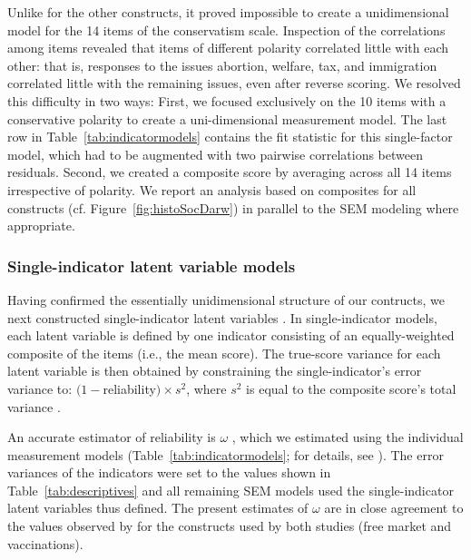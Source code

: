 \documentclass[fignum,man]{apa}\usepackage[]{graphicx}\usepackage[]{color}
\begin{document}
Unlike for the other constructs, it proved impossible to create a unidimensional 
model for the 14 items of the conservatism scale. Inspection of the correlations among
items revealed that items of different polarity correlated little with each
other: that is, responses to the issues abortion, welfare, tax, and immigration
correlated little with the remaining issues, even after reverse scoring. 
We resolved this difficulty in two ways: First, we focused
exclusively on the 10 items
with a conservative polarity to create 
a uni-dimensional measurement model.
The last row in Table~\ref{tab:indicatormodels} contains the
fit statistic for this single-factor model, which 
had to be augmented with two pairwise correlations between residuals.
Second, 
  we created a composite score by averaging across all 
  14 items irrespective of polarity. 
  We report an analysis based on composites for all constructs (cf. Figure~\ref{fig:histoSocDarw}) 
  in parallel to the SEM modeling where appropriate.

\subsubsection{Single-indicator latent variable models}
Having confirmed the essentially unidimensional structure
of our contructs, we next
constructed single-indicator latent variables \cite{Hayduk96,Joreskog82}.
In single-indicator models, each latent variable is defined 
by one indicator consisting of an equally-weighted composite 
of the items (i.e., the mean score).
The true-score variance for each latent variable is then obtained by 
constraining the single-indicator's error variance 
to: $(1 - $reliability$) \times s^2$, 
where $s^2$ is equal to the composite score's total variance \cite{Joreskog82}.

An accurate 
estimator of reliability 
is $\omega$ \cite{Komaroff97,Raykov97}, which
  we estimated using the individual measurement 
models (Table~\ref{tab:indicatormodels}; 
for details, see ).
The error variances of the indicators were set to 
the values shown in Table~\ref{tab:descriptives}
and all remaining SEM models used the single-indicator latent variables 
thus defined.
The present estimates of $\omega$ are in close agreement to the values observed by 
 for the constructs used by both studies (free market and vaccinations). 
\end{document}
